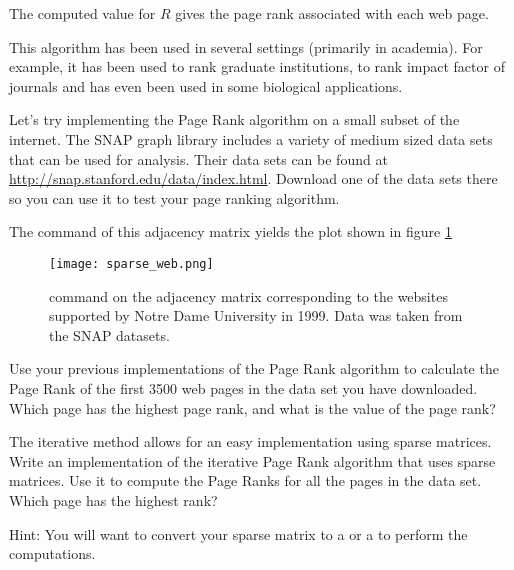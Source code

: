 The computed value for $R$ gives the page rank associated with each web page.

This algorithm has been used in several settings (primarily in academia).
For example, it has been used to rank graduate institutions, to rank impact factor of journals and has even been used in some biological applications.

Let's try implementing the Page Rank algorithm on a small subset of the internet.
The SNAP graph library includes a variety of medium sized data sets that can be used for analysis.
Their data sets can be found at \url{http://snap.stanford.edu/data/index.html}.
Download one of the data sets there so you can use it to test your page ranking algorithm.

The  command of this adjacency matrix yields the plot shown in figure \ref{fig:WebSparse}

\begin{figure}
\centering
\texttt{[image: sparse\_web.png]}
\caption{ command on the adjacency matrix corresponding to the websites supported by Notre Dame University in 1999.
Data was taken from the SNAP datasets.}
\label{fig:WebSparse}
\end{figure}

\begin{problem}
Use your previous implementations of the Page Rank algorithm to calculate the Page Rank of the first 3500 web pages in the data set you have downloaded.
Which page has the highest page rank, and what is the value of the page rank?
\label{prob:pg_calc}
\end{problem}

\begin{problem}
The iterative method allows for an easy implementation using sparse matrices.
Write an implementation of the iterative Page Rank algorithm that uses sparse matrices.
Use it to compute the Page Ranks for all the pages in the data set.
Which page has the highest rank?

Hint: You will want to convert your sparse matrix to a  or a  to perform the computations.
\end{problem}
